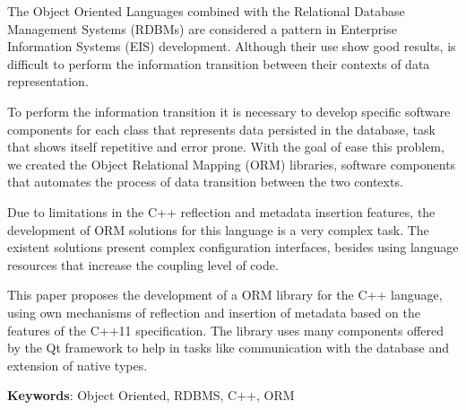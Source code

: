 The Object Oriented Languages combined with the Relational Database Management Systems (RDBMs) are considered a pattern in Enterprise Information Systems (EIS) development. Although their use show good results, is difficult to perform the information transition between their contexts of data representation.

To perform the information transition it is necessary to develop specific software components for each class that represents data persisted in the database, task that shows itself repetitive and error prone. With the goal of ease this problem, we created the Object Relational Mapping (ORM) libraries, software components that automates the process of data transition between the two contexts.

Due to limitations in the C++ reflection and metadata insertion features, the development of ORM solutions for this language is a very complex task. The existent solutions present complex configuration interfaces, besides using language resources that increase the coupling level of code.

This paper proposes the development of a ORM library for the C++ language, using own mechanisms of reflection and insertion of metadata based on the features of the C++11 specification. The library uses many components offered by the Qt framework to help in tasks like communication with the database and extension of native types.

{\bf{Keywords}}: Object Oriented, RDBMS, C++, ORM